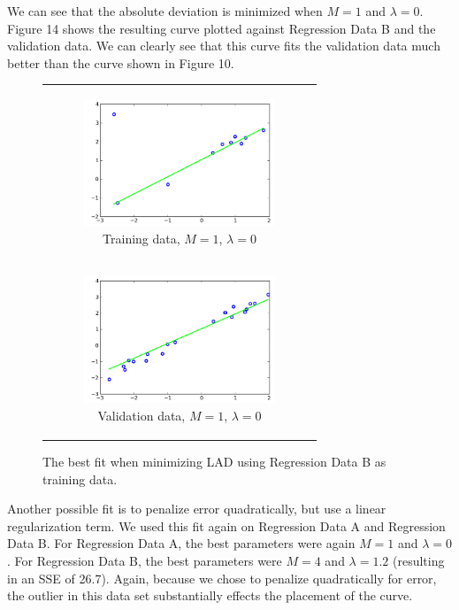 \documentclass{sigchi}
\begin{document}
We can see that the absolute deviation is minimized when $M = 1$ and $\lambda = 0$. Figure 14 shows the resulting curve plotted against Regression Data B and the validation data. We can clearly see that this curve fits the validation data much better than the curve shown in Figure 10.

\begin{figure}[!t]
\centering
\begin{tabular}{c}

\begin{subfigure}[b]{2.25in}
	\includegraphics[width = 2.25in]{B-fixed.png}
	\caption{Training data, $M = 1$, $\lambda = 0$}
\end{subfigure} \\

\begin{subfigure}[b]{2.25in}
	\includegraphics[width = 2.25in]{BV-fixed.png}
	\caption{Validation data, $M = 1$, $\lambda = 0$}
\end{subfigure} \\

\end{tabular}

\caption{The best fit when minimizing LAD using Regression Data B as training data.}
\end{figure}


Another possible fit is to penalize error quadratically, but use a linear regularization term. We used this fit again on Regression Data A and Regression Data B. For Regression Data A, the best parameters were again $M = 1$ and $\lambda = 0$. For Regression Data B, the best parameters were $M = 4$ and $\lambda = 1.2$ (resulting in an SSE of 26.7). Again, because we chose to penalize quadratically for error, the outlier in this data set substantially effects the placement of the curve.
\end{document}
